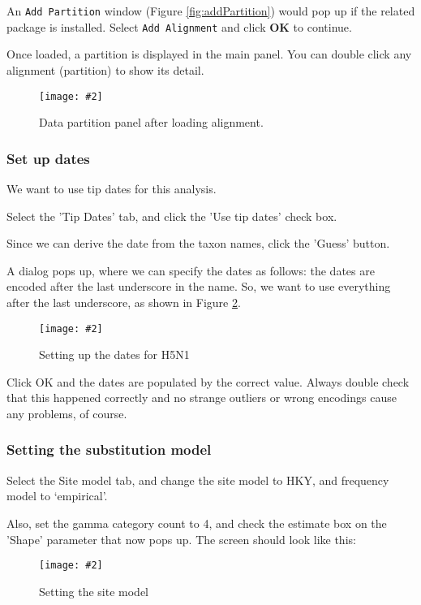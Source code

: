 \documentclass{article}
\newcommand{\includeimage}[2][]{%
\texttt{[image: \#2]}
}
\begin{document}
An \texttt{Add Partition} window (Figure \ref{fig:addPartition}) would pop up if the related package is installed. Select \texttt{Add Alignment} and click \textbf{OK} to continue.

Once loaded, a partition is displayed in the main panel.
You can double click any alignment (partition) to show its detail.

\begin{figure}
\centering	
\includeimage[scale=0.3,clip=true,trim=0 400 0 0]{figures/BEAUti_DataPartitions}
\caption{Data partition panel after loading alignment.}
\label{fig.datapartition} 
\end{figure}

\subsubsection*{Set up dates}

We want to use tip dates for this analysis.

Select the 'Tip Dates' tab, and click the 'Use tip dates' check box.

Since we can derive the date from the taxon names, click the 'Guess' button.

A dialog pops up, where we can specify the dates as follows: the dates are encoded after the last underscore in the name.
So, we want to use everything after the last underscore, as shown in Figure \ref{fig.dates}.

\begin{figure}
\centering	
\includeimage[scale=0.3]{figures/BEAUti_dates}
\caption{Setting up the dates for H5N1}
\label{fig.dates}
\end{figure}

Click OK and the dates are populated by the correct value. Always double check that this happened correctly and no strange outliers or wrong encodings cause any problems, of course.

\subsubsection*{Setting the substitution model}

Select the Site model tab, and change the site model to HKY, and frequency model to `empirical'.

Also, set the gamma category count to 4, and check the estimate box on the 'Shape' parameter that now pops up.
The screen should look like this:

\begin{figure}
\centering	
\includeimage[scale=0.3,clip=true,trim=0 400 0 0]{figures/BEAUti_sitemodel}
\caption{Setting the site model}
\label{fig.BEAUti_sitemodel}
\end{figure}
\end{document}
